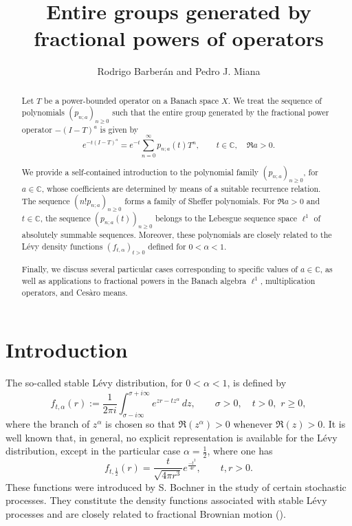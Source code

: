 \documentclass[a4paper,12pt]{amsart}
\title{ Entire groups generated by fractional powers of operators}
\author{Rodrigo Barber\'an and Pedro J. Miana}
\date{}
\def\CC{\mathbb C}
\def\CC{\mathbb C}
\theoremstyle{definition}
\theoremstyle{remark}
\begin{document}
\maketitle

\begin{abstract} Let $T$ be a power-bounded operator on a Banach space $X$. We treat the sequence of polynomials $(p_{n;a})_{n\ge 0}$ such that the entire group generated by the fractional power operator $-(I-T)^a$ is given by
$$
e^{-t(I-T)^a}=e^{-t}\sum_{n=0}^\infty p_{n;a}(t)T^n, \qquad t\in \CC, \quad \Re a>0.
$$

We provide a self-contained introduction to the polynomial family $(p_{n;a})_{n\ge 0}$, for $a\in \CC$, whose coefficients are determined by means of a suitable recurrence relation. The sequence $(n!p_{n;a})_{n\ge 0}$ forms a family of Sheffer polynomials. For $\Re a>0$ and $t\in \CC$, the sequence $(p_{n;a}(t))_{n\ge 0}$ belongs to the Lebesgue sequence space $\ell^1$ of absolutely summable sequences. Moreover, these polynomials are closely related to the L\'evy density functions $(f_{t,\alpha})_{t>0}$ defined for $0<\alpha<1$.

Finally, we discuss several particular cases corresponding to specific values of $a\in \CC$, as well as applications to fractional powers in the Banach algebra $\ell^1$, multiplication operators, and Cesàro means.
\end{abstract}




\section*{Introduction}


The so-called stable L\'{e}vy distribution, for $0<\alpha<1$, is defined by
\begin{equation}\label{levyfunct}
f_{t,\alpha}(r) :=  \frac{1}{2\pi i} \int_{\sigma - i \infty}^{ \sigma + i \infty} e^{ z r - t z^{\alpha}} \, dz, \qquad \sigma >0, \quad t>0, \,\, r \geq 0,
\end{equation}
where the branch of $z^{\alpha}$ is chosen so that ${\Re}(z^{\alpha})>0$ whenever ${\Re}(z)>0$. It is well known that, in general, no explicit representation is available for the L\'evy distribution, except in the particular case $\alpha=\frac{1}{2}$, where one has
\begin{equation*}
f_{t,\frac{1}{2}}(r)=\frac{t}{\sqrt{4\pi r^3}}e^{\frac{-t^2}{4r}}, \qquad  t,r>0.
\end{equation*}
These functions were introduced by S. Bochner  in the study of certain stochastic processes. They constitute the density functions associated with stable L\'evy processes and are closely related to fractional Brownian motion (\cite{Bochner1}).
\end{document}
